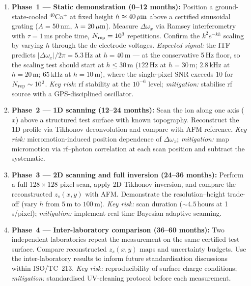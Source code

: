 \documentclass[12pt,a4paper]{article}
\begin{document}
\begin{enumerate}
\item \textbf{Phase~1 --- Static demonstration (0--12 months):}
      Position a ground-state-cooled ${}^{40}$Ca$^+$ at fixed height
      $h \approx 40\,\mu\textup{m}$ above a certified sinusoidal grating
      ($A = 50$\,nm, $\lambda = 20\,\mu\textup{m}$).  Measure
      $\Delta\omega_x$ via Ramsey interferometry with $\tau = 1$\,ms
      probe time, $N_{\rm rep} = 10^3$ repetitions.  Confirm the
      $k^2 e^{-kh}$ scaling by varying $h$ through the dc electrode
      voltages.  \textit{Expected signal:} the ITF predicts
      $|\Delta\omega_x|/2\pi = 5.3$\,Hz at $h=40$\,\textmu m --- at the
      conservative 5\,Hz floor, so the scaling test should start at
      $h\le30$\,\textmu m ($122$\,Hz at $h=30$\,\textmu m;
      $2.8$\,kHz at $h=20$\,\textmu m; $65$\,kHz at $h=10$\,\textmu m),
      where the single-pixel SNR exceeds $10$ for $N_{\rm rep}\sim10^2$.
      \textit{Key risk:} rf stability at the $10^{-6}$ level;
      \textit{mitigation:} stabilise rf source with a GPS-disciplined
      oscillator.

\item \textbf{Phase~2 --- 1D scanning (12--24 months):}
      Scan the ion along one axis ($x$) above a structured test surface
      with known topography.  Reconstruct the 1D profile via Tikhonov
      deconvolution and compare with AFM reference.  \textit{Key risk:}
      micromotion-induced position dependence of $\Delta\omega_x$;
      \textit{mitigation:} map micromotion via rf--photon correlation at
      each scan position and subtract the systematic.

\item \textbf{Phase~3 --- 2D scanning and full inversion (24--36 months):}
      Perform a full $128 \times 128$ pixel scan, apply 2D Tikhonov
      inversion, and compare the reconstructed $z_s(x,y)$ with AFM.
      Demonstrate the resolution--height trade-off (vary $h$ from
      $5$\,\textmu m to $100$\,\textmu m).  \textit{Key risk:}
      scan duration ($\sim 4.5$\,hours at 1\,s/pixel);
      \textit{mitigation:} implement real-time Bayesian adaptive scanning.

\item \textbf{Phase~4 --- Inter-laboratory comparison (36--60 months):}
      Two independent laboratories repeat the measurement on the same
      certified test surface.  Compare reconstructed $z_s(x,y)$ maps
      and uncertainty budgets.  Use the inter-laboratory results to
      inform future standardisation discussions within ISO/TC~213.
      \textit{Key risk:}
      reproducibility of surface charge conditions; \textit{mitigation:}
      standardised UV-cleaning protocol before each measurement.
\end{enumerate}
\end{document}
